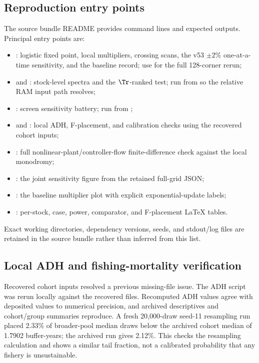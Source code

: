 \subsection{Reproduction entry points}

The source bundle README provides command lines and expected outputs. Principal entry points are:
\begin{itemize}
\item \texttt{}: logistic fixed point, local multipliers, crossing scans, the v53 \(\pm2\%\) one-at-a-time sensitivity, and the baseline record; use \texttt{} for the full 128-corner rerun;
\item \texttt{} and \texttt{}: stock-level spectra and the \(\Tr\)-ranked test; run from \texttt{} so the relative RAM input path resolves;
\item \texttt{}: screen sensitivity battery; run from \texttt{};
\item \texttt{} and \texttt{}: local ADH, F-placement, and calibration checks using the recovered cohort inputs;
\item \texttt{}: full nonlinear-plant/controller-flow finite-difference check against the local monodromy;
\item \texttt{}: the joint sensitivity figure from the retained full-grid JSON;
\item \texttt{}: the baseline multiplier plot with explicit exponential-update labels;
\item \texttt{}: per-stock, case, power, comparator, and F-placement LaTeX tables.
\end{itemize}
Exact working directories, dependency versions, seeds, and stdout/log files are retained in the source bundle rather than inferred from this list.

\subsection{Local ADH and fishing-mortality verification}

Recovered cohort inputs resolved a previous missing-file issue. The ADH script was rerun locally against the recovered files. Recomputed ADH values agree with deposited values to numerical precision, and archived descriptives and cohort/group summaries reproduce. A fresh 20,000-draw seed-11 resampling run placed 2.33\% of broader-pool median draws below the archived cohort median of 1.7902 buffer-years; the archived run gives 2.12\%. This checks the resampling calculation and shows a similar tail fraction, not a calibrated probability that any fishery is unsustainable.

